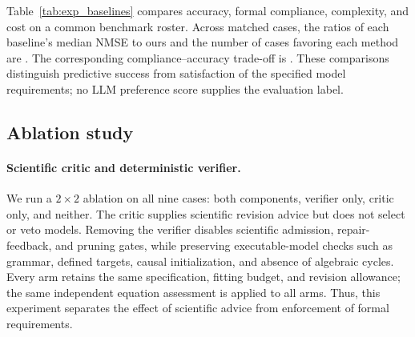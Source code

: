 Table~\ref{tab:exp_baselines} compares accuracy, formal compliance, complexity,
and cost on a common benchmark roster. Across matched cases, the ratios of each
baseline's median NMSE to ours and the number of cases favoring each method are
.
The corresponding compliance--accuracy trade-off is
.
These comparisons distinguish predictive success from satisfaction of the
specified model requirements; no LLM preference score supplies the evaluation
label.

\subsection{Ablation study}
\label{sec:exp_ablations}

\paragraph{Scientific critic and deterministic verifier.}
We run a $2\times2$ ablation on all nine cases: both components, verifier only,
critic only, and neither. The critic supplies scientific revision advice but
does not select or veto models. Removing the verifier disables scientific
admission, repair-feedback, and pruning gates, while preserving executable-model
checks such as grammar, defined targets, causal initialization, and absence of
algebraic cycles. Every arm retains the same specification, fitting budget, and
revision allowance; the same independent equation assessment is applied to all
arms. Thus, this experiment separates the effect of scientific advice from
enforcement of formal requirements.


